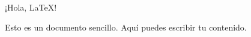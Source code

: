 \documentclass{article}
\begin{document}
¡Hola, LaTeX!

Esto es un documento sencillo. Aquí puedes escribir tu contenido.
\end{document}
